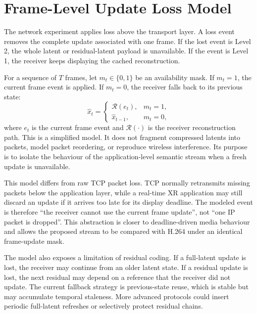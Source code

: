 \documentclass[conference]{IEEEtran}
\begin{document}

\section{Frame-Level Update Loss Model}

The network experiment applies loss above the transport layer. A loss event removes the complete update associated with one frame. If the lost event is Level 2, the whole latent or residual-latent payload is unavailable. If the event is Level 1, the receiver keeps displaying the cached reconstruction.

For a sequence of $T$ frames, let $m_t \in \{0,1\}$ be an availability mask. If $m_t=1$, the current frame event is applied. If $m_t=0$, the receiver falls back to its previous state:
\begin{equation}
\hat{x}_t =
\begin{cases}
    \mathcal{R}(e_t), & m_t=1,\\
    \hat{x}_{t-1}, & m_t=0,
\end{cases}
\end{equation}
where $e_t$ is the current frame event and $\mathcal{R}(\cdot)$ is the receiver reconstruction path. This is a simplified model. It does not fragment compressed latents into packets, model packet reordering, or reproduce wireless interference. Its purpose is to isolate the behaviour of the application-level semantic stream when a fresh update is unavailable.

This model differs from raw TCP packet loss. TCP normally retransmits missing packets below the application layer, while a real-time XR application may still discard an update if it arrives too late for its display deadline. The modeled event is therefore ``the receiver cannot use the current frame update'', not ``one IP packet is dropped''. This abstraction is closer to deadline-driven media behaviour and allows the proposed stream to be compared with H.264 under an identical frame-update mask.

The model also exposes a limitation of residual coding. If a full-latent update is lost, the receiver may continue from an older latent state. If a residual update is lost, the next residual may depend on a reference that the receiver did not update. The current fallback strategy is previous-state reuse, which is stable but may accumulate temporal staleness. More advanced protocols could insert periodic full-latent refreshes or selectively protect residual chains.
\end{document}
